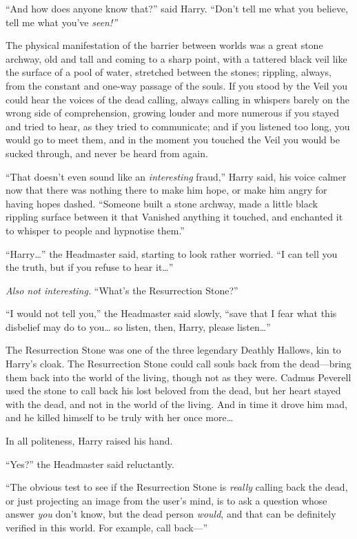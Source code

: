 ``And how does anyone know that?'' said Harry. ``Don't tell me what you
believe, tell me what you've \emph{seen!''}

The physical manifestation of the barrier between worlds was a great
stone archway, old and tall and coming to a sharp point, with a tattered
black veil like the surface of a pool of water, stretched between the
stones; rippling, always, from the constant and one-way passage of the
souls. If you stood by the Veil you could hear the voices of the dead
calling, always calling in whispers barely on the wrong side of
comprehension, growing louder and more numerous if you stayed and tried
to hear, as they tried to communicate; and if you listened too long, you
would go to meet them, and in the moment you touched the Veil you would
be sucked through, and never be heard from again.

``That doesn't even sound like an \emph{interesting} fraud,'' Harry
said, his voice calmer now that there was nothing there to make him
hope, or make him angry for having hopes dashed. ``Someone built a stone
archway, made a little black rippling surface between it that Vanished
anything it touched, and enchanted it to whisper to people and hypnotise
them.''

``Harry\ldots{}'' the Headmaster said, starting to look rather worried.
``I can tell you the truth, but if you refuse to hear it\ldots{}''

\emph{Also not interesting.} ``What's the Resurrection Stone?''

``I would not tell you,'' the Headmaster said slowly, ``save that I fear
what this disbelief may do to you\ldots{} so listen, then, Harry, please
listen\ldots{}''

The Resurrection Stone was one of the three legendary Deathly Hallows,
kin to Harry's cloak. The Resurrection Stone could call souls back from
the dead---bring them back into the world of the living, though not as
they were. Cadmus Peverell used the stone to call back his lost beloved
from the dead, but her heart stayed with the dead, and not in the world
of the living. And in time it drove him mad, and he killed himself to be
truly with her once more\ldots{}

In all politeness, Harry raised his hand.

``Yes?'' the Headmaster said reluctantly.

``The obvious test to see if the Resurrection Stone is \emph{really}
calling back the dead, or just projecting an image from the user's mind,
is to ask a question whose answer \emph{you} don't know, but the dead
person \emph{would}, and that can be definitely verified in this world.
For example, call back---''

